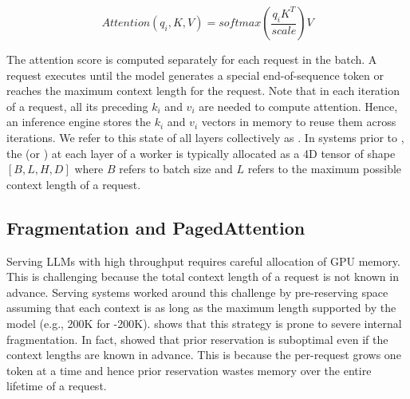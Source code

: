 \begin{equation}
Attention(q_{i}, K, V) = softmax(\frac{q_{i}K^T}{scale})V    
\label{eq:attention}
\end{equation}

\begin{table}[t!]
\centering
{}
\caption{Notations used in the paper.}
\vspace{-1em}
\label{table:notation}
\end{table}


The attention score is computed separately for each request in the batch. A request executes until the model generates a special end-of-sequence token or reaches the maximum context length for the request. Note that in each iteration of a request, all its preceding $k_{i}$ and $v_{i}$ are needed to compute attention. Hence, an inference engine stores the $k_{i}$ and $v_{i}$ vectors in memory to reuse them across iterations. We refer to this state of all layers collectively as \kvcache. In systems prior to \pa, the \kcache (or \vcache) at each layer of a worker is typically allocated as a 4D tensor of shape $[B, L, H, D]$ where $B$ refers to batch size and $L$ refers to the maximum possible context length of a request.


\subsection{Fragmentation and PagedAttention}
Serving LLMs with high throughput requires careful allocation of GPU memory. This is challenging because the total context length of a request is not known in advance. Serving systems worked around this challenge by pre-reserving \kvcache space assuming that each context is as long as the maximum length supported by the model (e.g., 200K for \yimedium-200K). \vllm shows that this strategy is prone to severe internal fragmentation. In fact, \vllm showed that prior reservation is suboptimal even if the context lengths are known in advance. This is because the per-request \kvcache grows one token at a time and hence prior reservation wastes memory over the entire lifetime of a request. 

